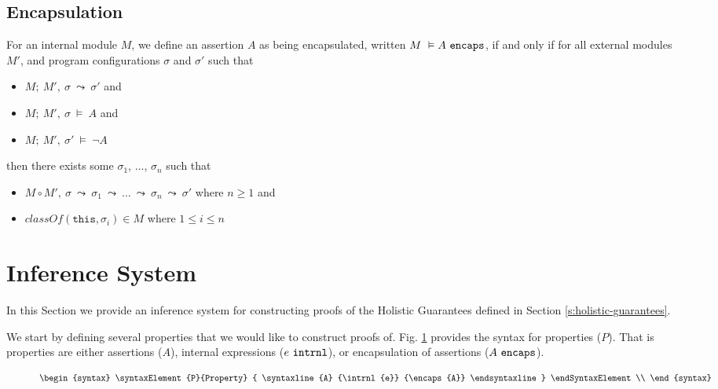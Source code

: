 \documentclass[acmsmall,review,anonymous]{acmart}\settopmatter{printfolios=true,printccs=false,printacmref=false}
\begin{document}
\subsection{Encapsulation}

\begin{definition}[Encapsulation]
For an internal module $M$, we define an assertion $A$ as being 
encapsulated, written $M\ \vDash A\ \texttt{encaps}$, if and only if
for all external modules $M'$, and program configurations $\sigma$ and $\sigma'$
such that 
\begin{itemize}
\item
$M;\ M',\ \sigma\ \leadsto\ \sigma'$ and 
\item
$M;\ M',\ \sigma\ \vDash\ A$ and
\item
$M;\ M',\ \sigma'\ \vDash\ \neg A$
\end{itemize}
then there exists some $\sigma_1$, $\ldots$, $\sigma_n$ such that
\begin{itemize}
\item
$M \circ M',\ \sigma\ \leadsto\ \sigma_1\ \leadsto\ \ldots\ \leadsto\ \sigma_n\ \leadsto\ \sigma'$ where $n \geq 1$ and 
\item
$classOf(\texttt{this}, \sigma_i) \in M$ where $1 \leq i \leq n$
\end{itemize}
\end{definition}



\section{Inference System}  

In this Section we provide an inference system for constructing 
proofs of the Holistic Guarantees defined in Section \ref{s:holistic-guarantees}. 

We start by defining several properties that we would like to construct proofs of. 
Fig. \ref{f:property-syntax} provides the syntax for properties ($P$). That is
properties are either assertions ($A$), internal expressions ($e\ \texttt{intrnl}$), 
or encapsulation of assertions ($A\ \texttt{encaps}$).
\begin{figure}[t]
\[
\begin{syntax}
\syntaxElement{P}{Property}
		{
		\syntaxline
				{A}
				{\intrnl{e}}
				{\encaps{A}}
		\endsyntaxline
		}
\endSyntaxElement\\
\end{syntax}
\]
\caption{}
\label{f:property-syntax}
\end{figure}
\end{document}
